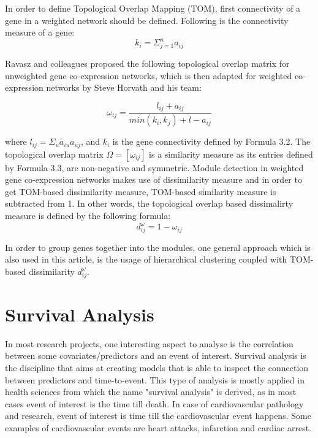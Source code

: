 \documentclass{ba-kecs}
\numberwithin{figure}{section}
\numberwithin{equation}{section}
\begin{document}
In order to define Topological Overlap Mapping (TOM), first connectivity of a gene in a weighted network should be defined. Following is the connectivity measure of a gene:
\begin{equation}
k_i = \Sigma_{j=1}^n a_{ij}
\end{equation}

Ravasz and colleagues proposed the following topological overlap matrix for unweighted gene co-expression networks, which is then adapted for weighted co-expression networks by Steve Horvath and his team:

\begin{equation}
\omega _{ij} = \dfrac{l _{ij} + a_{ij}}{min(k_i,k_j) + l - a_{ij}}
\end{equation}

where $l_{ij} = \Sigma_u a_{iu}a_{uj}$, and $k_i$ is the gene connectivity defined by Formula 3.2.  The topological overlap matrix $\Omega = [\omega_{ij}]$ is a similarity measure as its entries defined by Formula 3.3, are non-negative and symmetric. Module detection in weighted gene co-expression networks makes use of dissimilarity measure and in order to get TOM-based dissimilarity measure, TOM-based similarity measure is subtracted from 1. In other words, the topological overlap based dissimalirty measure is defined by the following formula:
\begin{equation}
d^{\omega}_{ij} = 1 - \omega_{ij}
\end{equation}

In order to group genes together into the modules, one general approach which is also used in this article, is the usage of hierarchical clustering coupled with TOM-based dissimilarity $d^{\omega}_{ij}$.

\section{Survival Analysis}
In most research projects, one interesting aspect to analyse is the correlation between some covariates/predictors and an event of interest. Survival analysis is the discipline that aims at creating models that is able to inspect the connection between predictors and time-to-event. This type of analysis is mostly applied in health sciences from which the name "survival analysis" is derived, as in most cases event of interest is the time till death. In case of cardiovascular pathology and research, event of interest is time till the cardiovascular event happens. Some examples of cardiovascular events are heart attacks, infarction and cardiac arrest.
\end{document}
